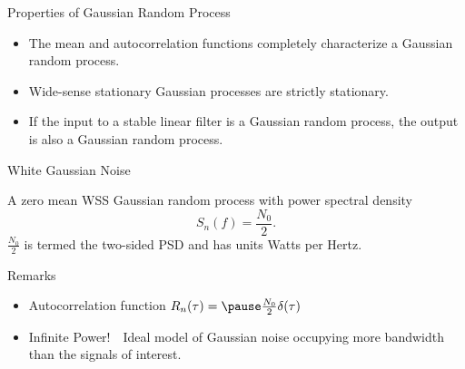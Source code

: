 \documentclass[t]{beamer}
\begin{document}
\begin{frame}{Properties of Gaussian Random Process}
  \footnotesize
  \begin{itemize}
    \item The mean and autocorrelation functions completely characterize a Gaussian random process.
    \item \pause Wide-sense stationary Gaussian processes are strictly stationary.
    \item \pause If the input to a stable linear filter is a Gaussian random process, the output is also a Gaussian random process.
      \begin{figure}[h]
      \centering
      \end{figure}
  \end{itemize}
  \normalsize
\end{frame}

\begin{frame}{White Gaussian Noise}
  \footnotesize
  \pause
  \begin{definition}[]
    A zero mean WSS Gaussian random process with power spectral density
    \begin{equation*}
      S_n(f) = \frac{N_0}{2}.
    \end{equation*}
    \pause $\frac{N_0}{2}$ is termed the two-sided PSD and has units Watts per Hertz.
  \end{definition}
  \pause
  \begin{block}{Remarks}
    \begin{itemize}
      \item Autocorrelation function $R_n(\tau) = \pause \frac{N_0}{2}\delta(\tau)$
      \item \pause \alert{Infinite Power!}\pause \ \  Ideal model of Gaussian noise occupying more bandwidth than the signals of interest.
    \end{itemize}
  \end{block}
  \normalsize
\end{frame}
\end{document}
